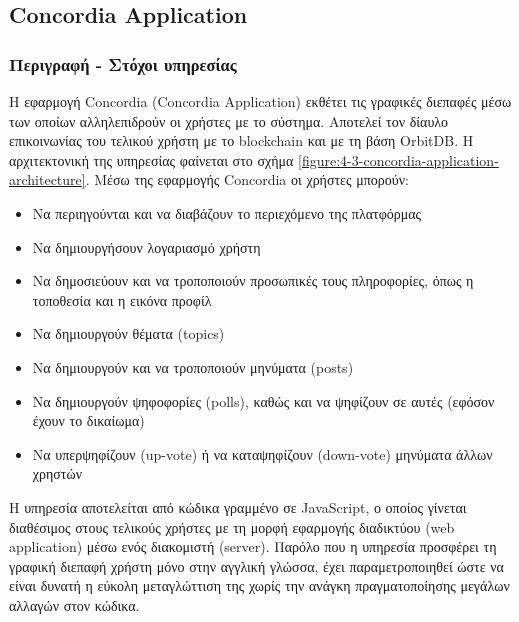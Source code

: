 \subsection{Concordia Application} \label{subsection:4-3-2-concordia-application-service}

\subsubsection{Περιγραφή - Στόχοι υπηρεσίας}


Η εφαρμογή Concordia (Concordia Application) εκθέτει τις γραφικές διεπαφές μέσω των οποίων αλληλεπιδρούν οι χρήστες με το σύστημα. Αποτελεί τον δίαυλο επικοινωνίας του τελικού χρήστη με το blockchain και με τη βάση OrbitDB. Η αρχιτεκτονική της υπηρεσίας φαίνεται στο σχήμα \ref{figure:4-3-concordia-application-architecture}. Μέσω της εφαρμογής Concordia οι χρήστες μπορούν:

\begin{itemize}
    \item Να περιηγούνται και να διαβάζουν το περιεχόμενο της πλατφόρμας

    \item Να δημιουργήσουν λογαριασμό χρήστη

    \item Να δημοσιεύουν και να τροποποιούν προσωπικές τους πληροφορίες, όπως η τοποθεσία και η εικόνα προφίλ

    \item Να δημιουργούν θέματα (topics)

    \item Να δημιουργούν και να τροποποιούν μηνύματα (posts)

    \item Να δημιουργούν ψηφοφορίες (polls), καθώς και να ψηφίζουν σε αυτές (εφόσον έχουν το δικαίωμα)

    \item Να υπερψηφίζουν (up-vote) ή να καταψηφίζουν (down-vote) μηνύματα άλλων χρηστών
\end{itemize}

Η υπηρεσία αποτελείται από κώδικα γραμμένο σε JavaScript, ο οποίος γίνεται διαθέσιμος στους τελικούς χρήστες με τη μορφή εφαρμογής διαδικτύου (web application) μέσω ενός διακομιστή (server). Παρόλο που η υπηρεσία προσφέρει τη γραφική διεπαφή χρήστη μόνο στην αγγλική γλώσσα, έχει παραμετροποιηθεί ώστε να είναι δυνατή η εύκολη μεταγλώττιση της χωρίς την ανάγκη πραγματοποίησης μεγάλων αλλαγών στον κώδικα.

